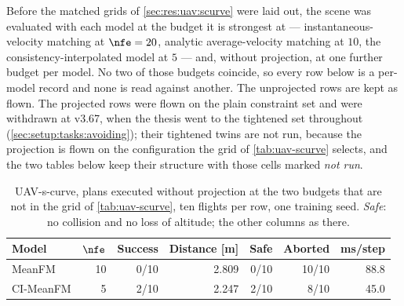 Before the matched grids of \autoref{sec:res:uav:scurve} were laid out, the scene was evaluated with
each model at the budget it is strongest at --- instantaneous-velocity matching at $\nfe=20$, analytic
average-velocity matching at $10$, the consistency-interpolated model at $5$ --- and, without projection,
at one further budget per model. No two of those budgets coincide, so every row below is a per-model
record and none is read against another. The unprojected rows are kept as flown. The projected rows were
flown on the plain constraint set and were withdrawn at v3.67, when the thesis went to the tightened set
throughout (\autoref{sec:setup:tasks:avoiding}); their tightened twins are not run, because
the projection is flown on the configuration the grid of \autoref{tab:uav-scurve} selects, and the two
tables below keep their structure with those cells marked \emph{not run}.

\begin{table}[htpb]
  \caption[UAV-s-curve: unprojected cells outside the grid]{UAV-s-curve, plans executed without
  projection at the two budgets that are not in the grid of \autoref{tab:uav-scurve}, ten flights per row,
  one training seed. \emph{Safe}: no collision and no loss of altitude; the other columns as there.}
  \label{tab:app:uav-scurve-unprojected-extra}
  \centering
  \small
  \begin{tabularx}{\linewidth}{@{}L r r r r r r@{}}
    \toprule
    Model & $\nfe$ & Success & Distance [m] & Safe & Aborted & ms/step \\
    \midrule
    MeanFM    & 10 & 0/10 & 2.809 & 0/10 & 10/10 & 88.8 \\
    CI-MeanFM & 5  & 2/10 & 2.247 & 2/10 & 8/10  & 45.0 \\
    \bottomrule
  \end{tabularx}
\end{table}

